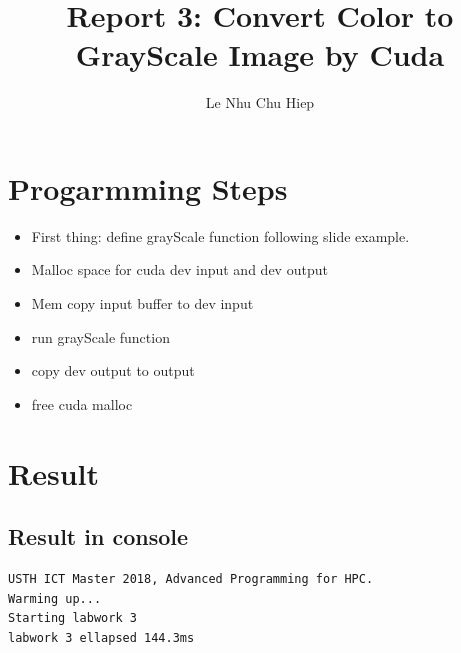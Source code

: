 \documentclass{article}
\title{Report 3: Convert Color to GrayScale Image by Cuda}
\author{Le Nhu Chu Hiep}
\begin{document}
\maketitle

\section{Progarmming Steps}
\begin{itemize}
    \item First thing: define grayScale function following slide example.
    \item Malloc space for cuda dev input and dev output
    \item Mem copy input buffer to dev input
    \item run grayScale function
    \item copy dev output to output
    \item free cuda malloc
\end{itemize}

\section{Result}
\subsection{Result in console}
\begin{verbatim}
USTH ICT Master 2018, Advanced Programming for HPC.
Warming up...
Starting labwork 3
labwork 3 ellapsed 144.3ms
\end{verbatim}
\end{document}
